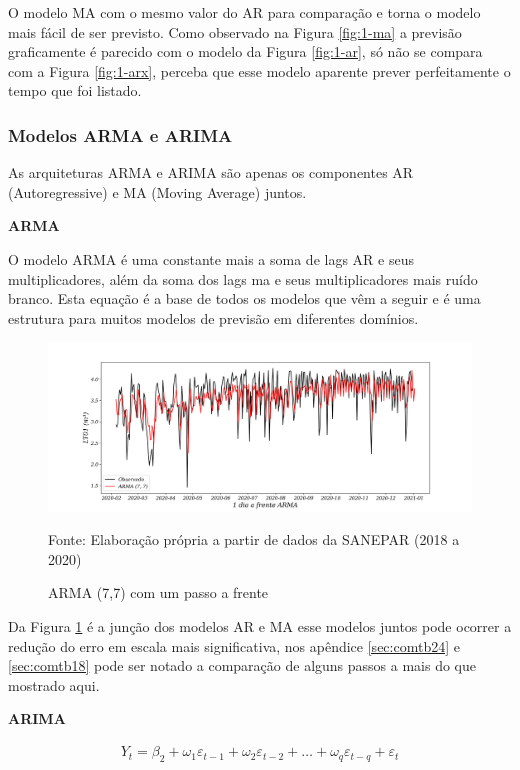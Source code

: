 O modelo MA com o mesmo valor do AR para comparação e torna o modelo mais fácil de ser previsto. Como observado na Figura \ref{fig:1-ma} a previsão graficamente é parecido com o modelo da Figura \ref{fig:1-ar}, só não se compara com a Figura \ref{fig:1-arx}, perceba que esse modelo aparente prever perfeitamente o tempo que foi listado.  

\subsubsection{Modelos ARMA e ARIMA}\label{subsubsec:arma}
As arquiteturas ARMA e ARIMA são apenas os componentes AR (Autoregressive) e MA (Moving Average) juntos.

\textbf{ARMA}

O modelo ARMA é uma constante mais a soma de lags AR e seus multiplicadores, além da soma dos lags ma e seus multiplicadores mais ruído branco. Esta equação é a base de todos os modelos que vêm a seguir e é uma estrutura para muitos modelos de previsão em diferentes domínios.

\begin{figure}[H]
	\centering
	\caption{ARMA (7,7) com um passo a frente}
	\label{fig:1-arma}
	\includegraphics[width=1\linewidth]{Modelos/Figuras/1-ARMA}
	
	Fonte: Elaboração própria a partir de dados da SANEPAR (2018 a 2020)
\end{figure}

Da Figura \ref{fig:1-arma} é a junção dos modelos AR e MA esse modelos juntos pode ocorrer a redução do erro em escala mais significativa, nos apêndice \ref{sec:comtb24} e \ref{sec:comtb18} pode ser notado a comparação de alguns passos a mais do que mostrado aqui.

\textbf{ARIMA}

\begin{eqnarray}
	Y_t = \beta_2 + \omega_1\varepsilon_{t-1} + \omega_2 \varepsilon_{t-2} +\ldots+ \omega_q \varepsilon_{t-q} + \varepsilon_t \label{arima}
\end{eqnarray}


